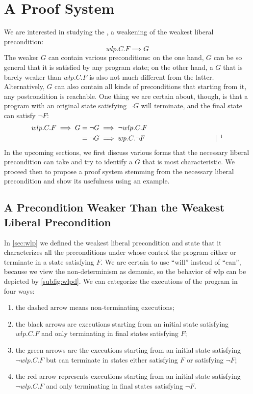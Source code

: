 \chapter{A Proof System}\label{ch:system} %

We are interested in studying the , a weakening of the weakest liberal precondition: 
$$wlp.C.F\implies G$$
The weaker $G$ can contain various preconditions: on the one hand, $G$ can be so general that it is satisfied by any program state; on the other hand, a $G$ that is barely weaker than $wlp.C.F$ is also not much different from the latter. 
Alternatively, $G$ can also contain all kinds of preconditions that starting from it, any postcondition is reachable. 
One thing we are certain about, though, is that a program with an original state satisfying $\neg G$ will terminate, and the final state can satisfy $\neg F$: 
\begin{align*}
wlp.C.F\implies G & = \neg G \implies \neg wlp.C.F \\
	& = \neg G \implies wp.C.\neg F 
	\hspace{0.3\textwidth} | \ \todo{insert theorem: wlp and wp are conjugates} 
\end{align*}
In the upcoming sections, we first discuss various forms that the necessary liberal precondition can take and try to identify a $G$ that is most characteristic. 
We proceed then to propose a proof system stemming from the necessary liberal precondition and show its usefulness using an example.  

\section{A Precondition Weaker Than the Weakest Liberal Precondition}
In \autoref{sec:wlp} we defined the weakest liberal precondition and state that it characterizes all the preconditions under whose control the program either  or  terminate in a state satisfying $F$. 
We are certain to use ``will'' instead of ``can'', because we view the non-determinism as demonic, so the behavior of wlp can be depicted by \autoref{subfig:wlpd}. 
We can categorize the executions of the program in four ways: 
\begin{enumerate}
	\item the dashed arrow means non-terminating executions; 
	\item the black arrows are executions starting from an initial state satisfying $wlp.C.F$ and only terminating in final states satisfying $F$; 
	\item the green arrows are the executions starting from an initial state satisfying $\neg wlp.C.F$ but can terminate in states either satisfying $F$ or satisfying $\neg F$;
	\item the red arrow represents executions starting from an initial state satisfying $\neg wlp.C.F$ and only terminating in final states satisfying $\neg F$. 
\end{enumerate}

